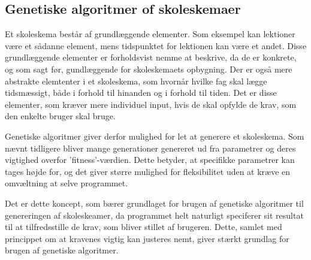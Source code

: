 \subsection{Genetiske algoritmer of skoleskemaer}
Et skoleskema består af grundlæggende elementer. Som eksempel kan lektioner være et sådanne element, mens tidspunktet for lektionen kan være et andet. Disse grundlæggende elementer er forholdsvist nemme at beskrive, da de er konkrete, og som sagt før, gundlæggende for skoleskemaets opbygning. Der er også mere abstrakte elemtenter i et skoleskema, som hvornår hvilke fag skal lægge tidsmæssigt, både i forhold til hinanden og i forhold til tiden. Det er disse elementer, som kræver mere individuel input, hvis de skal opfylde de krav, som den enkelte bruger skal bruge.

Genetiske algoritmer giver derfor mulighed for let at generere et skoleskema. Som nævnt tidligere bliver mange generationer genereret ud fra parametrer og deres vigtighed overfor 'fitness'-værdien. Dette betyder, at specifikke parametrer kan tages højde for, og det giver større mulighed for fleksibilitet uden at kræve en omvæltning at selve programmet. 

Det er dette koncept, som bærer grundlaget for brugen af genetiske algoritmer til genereringen af skoleskeamer, da programmet helt naturligt speciferer sit resultat til at tilfredsstille de krav, som bliver stillet af brugeren. Dette, samlet med princippet om at kravenes vigtig kan justeres nemt, giver stærkt grundlag for brugen af genetiske algoritmer.

